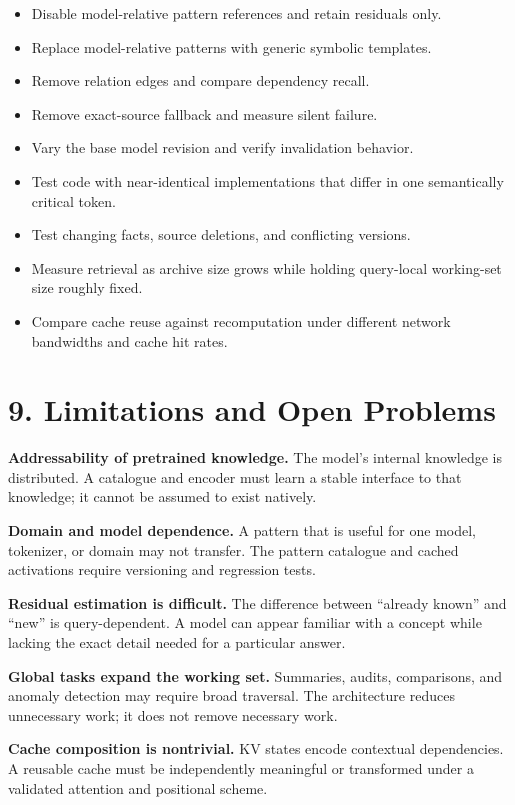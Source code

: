 \documentclass[
  10pt,
]{article}
\providecommand{\tightlist}{%
  \setlength{\itemsep}{0pt}\setlength{\parskip}{0pt}}
\begin{document}
\begin{itemize}
\tightlist
\item
  Disable model-relative pattern references and retain residuals only.
\item
  Replace model-relative patterns with generic symbolic templates.
\item
  Remove relation edges and compare dependency recall.
\item
  Remove exact-source fallback and measure silent failure.
\item
  Vary the base model revision and verify invalidation behavior.
\item
  Test code with near-identical implementations that differ in one
  semantically critical token.
\item
  Test changing facts, source deletions, and conflicting versions.
\item
  Measure retrieval as archive size grows while holding query-local
  working-set size roughly fixed.
\item
  Compare cache reuse against recomputation under different network
  bandwidths and cache hit rates.
\end{itemize}

\section{9. Limitations and Open
Problems}\label{limitations-and-open-problems}

\textbf{Addressability of pretrained knowledge.} The model's internal
knowledge is distributed. A catalogue and encoder must learn a stable
interface to that knowledge; it cannot be assumed to exist natively.

\textbf{Domain and model dependence.} A pattern that is useful for one
model, tokenizer, or domain may not transfer. The pattern catalogue and
cached activations require versioning and regression tests.

\textbf{Residual estimation is difficult.} The difference between
``already known'' and ``new'' is query-dependent. A model can appear
familiar with a concept while lacking the exact detail needed for a
particular answer.

\textbf{Global tasks expand the working set.} Summaries, audits,
comparisons, and anomaly detection may require broad traversal. The
architecture reduces unnecessary work; it does not remove necessary
work.

\textbf{Cache composition is nontrivial.} KV states encode contextual
dependencies. A reusable cache must be independently meaningful or
transformed under a validated attention and positional scheme.
\end{document}
